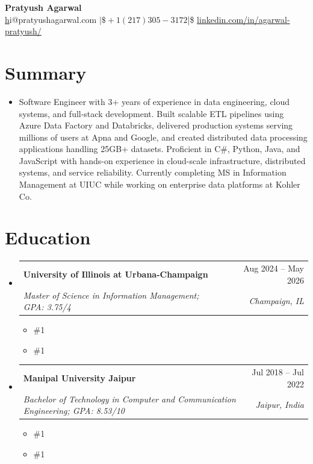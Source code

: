 \documentclass[letterpaper,11pt]{article}
\makeatletter
\newcommand{\resumeSubheading}[4]{
  \vspace{0pt}\item
    \begin{tabular*}{\textwidth}{l@{\extracolsep{\fill}}r}
      \textbf{#1} & #2 \\
      \textit{#3} & \textit{#4} \\ 
    \end{tabular*}\vspace{-6pt}
}
\newcommand{\resumeEducationCoursework}[1]{
  \vspace{-9pt} 
  \begin{itemize}[leftmargin=0pt, label={}]
    \item {\#1}
  \end{itemize}
}
\newcommand{\resumeEducationCertifications}[1]{
  \vspace{-15pt} 
  \begin{itemize}[leftmargin=0pt, label={}]
    \item {\#1}
  \end{itemize}
}
\newcommand{\resumeSubHeadingListStart}{\begin{itemize}[leftmargin=0pt,label={},itemsep=-2pt]}
\newcommand{\resumeSubHeadingListEnd}{\end{itemize}}
\makeatother
\begin{document}
\justifying

\begin{center}
    \textbf{\LARGE Pratyush Agarwal} \\ \vspace{5pt}
    \href{mailto:hi@pratyushagarwal.com}hi@pratyushagarwal.com $|\$ +1 (217) 305-3172 $|\$ \href{%
      https://linkedin.com/in/agarwal-pratyush/%
    }{%
      linkedin.com/in/agarwal-pratyush/%
    }
\end{center}

\section{Summary}
\begin{itemize}[leftmargin=0pt, label={}]
  \item { Software Engineer with 3+ years of experience in data engineering, cloud systems, and full-stack development. Built scalable ETL pipelines using Azure Data Factory and Databricks, delivered production systems serving millions of users at Apna and Google, and created distributed data processing applications handling 25GB+ datasets. Proficient in C\#, Python, Java, and JavaScript with hands-on experience in cloud-scale infrastructure, distributed systems, and service reliability. Currently completing MS in Information Management at UIUC while working on enterprise data platforms at Kohler Co. }
\end{itemize}

\section{Education}
  \resumeSubHeadingListStart
    \resumeSubheading
      {University of Illinois at Urbana-Champaign}{Aug 2024 -- May 2026}
      {Master of Science in Information Management; GPA: 3.75/4}{Champaign, IL}
      \resumeEducationCoursework{Relevant Coursework: Applied Machine Learning, Cloud Computing Applications, Data Mining, Data Warehousing and Business Intelligence, Information Modeling, Data Visualization, Data and Statistical Models.}
      \resumeEducationCertifications{Certifications: Getting Started with Microsoft Azure, Cloud Computing, The Complete Prompt Engineering for AI Bootcamp.}

    \resumeSubheading
      {Manipal University Jaipur}{Jul 2018 -- Jul 2022}
      {Bachelor of Technology in Computer and Communication Engineering; GPA: 8.53/10}{Jaipur, India}
      \resumeEducationCoursework{Relevant Coursework: Data Structures and Algorithms, Relational Database Management Systems, Operating Systems, Computer Networks, Software Testing, Cryptography and Security.}
      \resumeEducationCertifications{Certifications: Certified Ethical Hacker (EC Council), Google Project Management Specialization, Networking in Google Cloud, Architecting with Google Kubernetes Engine.}
  \resumeSubHeadingListEnd
\end{document}
